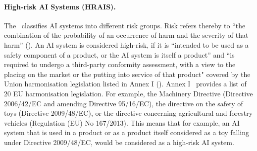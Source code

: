 \paragraph{High-risk AI Systems (HRAIS).} The \EUAIAct\ classifies AI systems into different risk groups.
%
Risk refers thereby to ``the combination of the probability of an occurrence of harm and the severity
of that harm'' ().
%
An AI system is considered high-risk, if it is ``intended to be used as a safety component of a product, or the AI
system is itself a product'' and ``is required to undergo a third-party conformity
assessment, with a view to the placing on the market or the putting into service of that product" covered by the Union harmonisation legislation listed in
Annex I ().
%
Annex I \EUAIAct\ provides a list of 20 EU harmonisation legislation. 
%
For example, the Machinery Directive (Directive 2006/42/EC and amending  Directive 95/16/EC), the directive on the safety of toys (Directive 2009/48/EC), or the directive concerning agricultural and forestry
vehicles (Regulation (EU) No 167/2013).
%
This means that for example, an AI system that is used in a product or as a product itself considered as a toy falling under Directive 2009/48/EC, would be considered as a high-risk AI system.
% 

